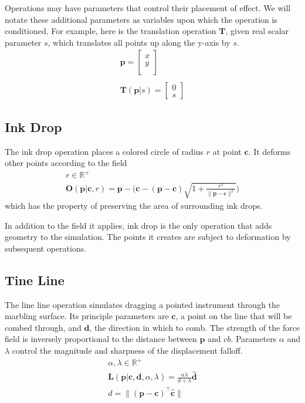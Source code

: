 \documentclass{article}
\newcommand{\cb}{\boldsymbol{c}}
\newcommand{\db}{\boldsymbol{d}}
\newcommand{\pb}{\boldsymbol{p}}
\newcommand{\Tb}{\boldsymbol{T}}
\begin{document}
Operations may have parameters that control their placement of effect. We will notate these additional parameters as variables upon which the operation is conditioned. For example, here is the translation operation $\Tb$, given real scalar parameter $s$, which translates all points up along the y-axis by $s$. 
\begin{gather*}
			\pb = \begin{bmatrix}
	x \\
	y\\
	\end{bmatrix}\\
	\\
	\Tb(\pb | s) = \begin{bmatrix}
	0 \\
	s
	\end{bmatrix}
\end{gather*}

\subsection{Ink Drop}

The ink drop operation places a colored circle of radius $r$ at point $\cb$. It deforms other points according to the field 
\begin{gather*}
	r \in \mathbb{R}^+\\
	\boldsymbol{O}(\pb | \cb, r) =  \pb - \Bigg(\cb - (\pb - \cb )\sqrt{1 + \frac{r^2}{\lVert\pb - \cb\rVert^2}}\Bigg)
\end{gather*}
which has the property of preserving the area of surrounding ink drops.

In addition to the field it applies, ink drop is the only operation that adds geometry to the simulation. The points it creates are subject to deformation by subsequent operations. 

\subsection{Tine Line}
The line line operation simulates dragging a pointed instrument through the marbling surface. Its principle parameters are $\cb$, a point on the line that will be combed through, and $\db$, the direction in which to comb. The strength of the force field is inversely proportional to the distance between $\pb$ and $cb$. Parameters $\alpha$ and $\lambda$ control the magnitude and sharpness of the displacement falloff. 
\begin{gather*} 
	\alpha, \lambda \in \mathbb{R}^+\\
	\boldsymbol{L}(\pb | \cb, \db, \alpha, \lambda) = \frac{\alpha\lambda}{d + \lambda}\hat{\db} \\	
    d = \lVert(\pb - \cb) ^ \top \hat{\cb}\rVert
\end{gather*}
\end{document}
